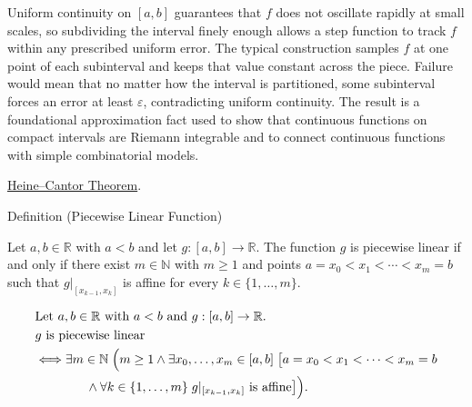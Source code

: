 \begin{remark*}[Interpretation]
Uniform continuity on $[a,b]$ guarantees that $f$ does not oscillate rapidly at small scales, so subdividing the interval finely enough allows a step function to track $f$ within any prescribed uniform error. The typical construction samples $f$ at one point of each subinterval and keeps that value constant across the piece. Failure would mean that no matter how the interval is partitioned, some subinterval forces an error at least $\varepsilon$, contradicting uniform continuity. The result is a foundational approximation fact used to show that continuous functions on compact intervals are Riemann integrable and to connect continuous functions with simple combinatorial models.
\end{remark*}

\begin{dependencies}
\hyperref[thm:heine-cantor]{Heine--Cantor Theorem}.
\end{dependencies}


\begin{definitionbox}{Definition (Piecewise Linear Function)}
\begin{definition}
\label{def:piecewise-linear-function}
Let $a,b \in \mathbb{R}$ with $a<b$ and let $g:[a,b]\to\mathbb{R}$.
The function $g$ is piecewise linear if and only if there exist
$m \in \mathbb{N}$ with $m \ge 1$ and points
$a=x_0<x_1<\cdots<x_m=b$ such that $g|_{[x_{k-1},x_k]}$ is affine
for every $k\in\{1,\ldots,m\}$.
\end{definition}
\end{definitionbox}

\begin{remark*}
\[
\begin{aligned}
&\text{Let } a,b \in \mathbb{R} \text{ with } a<b \text{ and } g:[a,b]\to\mathbb{R}.\\
&g \text{ is piecewise linear}\\
&\Longleftrightarrow
\exists m \in \mathbb{N}\;\Bigl(m \ge 1 \land
\exists x_0,\ldots,x_m \in [a,b]\;
\bigl[a=x_0 < x_1 < \cdots < x_m = b\\
&\qquad\qquad\land
\forall k \in \{1,\ldots,m\}\; g|_{[x_{k-1},x_k]} \text{ is affine}\bigr]\Bigr).
\end{aligned}
\]
\end{remark*}

